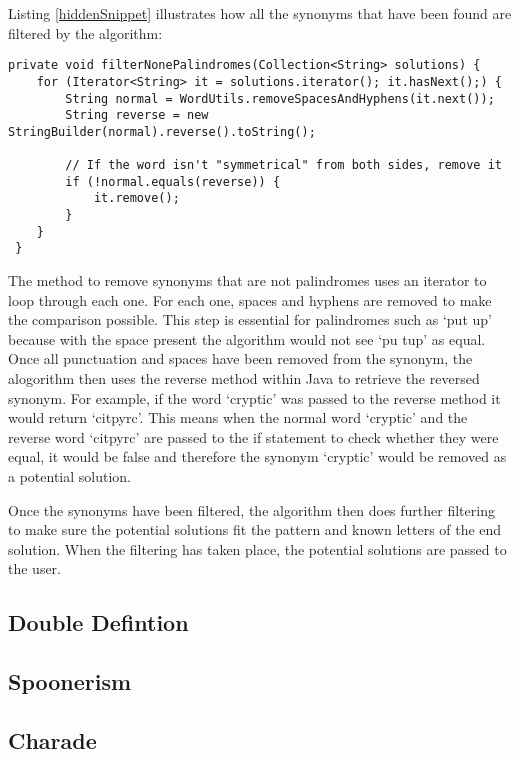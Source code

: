 Listing \ref{hiddenSnippet} illustrates how all the synonyms that have
 been found are filtered by the algorithm: 

\begin{lstlisting}[caption={INSERT CAPTION},
                   label=hiddenSnippet] 
 private void filterNonePalindromes(Collection<String> solutions) {
	for (Iterator<String> it = solutions.iterator(); it.hasNext();) {
		String normal = WordUtils.removeSpacesAndHyphens(it.next());
		String reverse = new StringBuilder(normal).reverse().toString();

		// If the word isn't "symmetrical" from both sides, remove it
		if (!normal.equals(reverse)) {
			it.remove();
		}
	}
 }
\end{lstlisting}

The method to remove synonyms that are not palindromes uses an 
iterator to loop through each one. For each one, spaces and hyphens 
are removed to make the comparison possible. This step is essential for 
palindromes such as `put up' because with the space present the 
algorithm would not see `pu tup' as equal. Once all punctuation and
spaces have been removed from the synonym, the alogorithm then 
uses the reverse method within Java to retrieve the reversed synonym. 
For example, if the word `cryptic' was passed to the reverse method 
it would return `citpyrc'. This means when the normal word `cryptic' 
and the reverse word `citpyrc' are passed to the if statement to check 
whether they were equal, it would be false and therefore the synonym 
`cryptic' would be removed as a potential solution.

Once the synonyms have been filtered, the algorithm then does further 
filtering to make sure the potential solutions fit the pattern and known 
letters of the end solution. When the filtering has taken place, the 
potential solutions are passed to the user.

\subsection{Double Defintion}

\subsection{Spoonerism}

\subsection{Charade}

